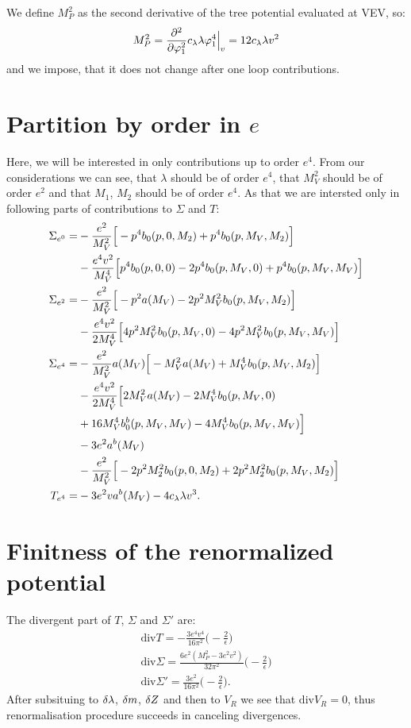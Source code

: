 We define $M_P^2$ as the second derivative of the tree potential evaluated at VEV, so:
\begin{equation}
M_P^2 = \frac{\partial^2}{\partial \varphi_1^2}c_\lambda\lambda\varphi_1^4\Big|_{v} = 12c_\lambda\lambda v^2
\end{equation}
and we impose, that it does not change after one loop contributions. \\
\section{Partition by order in \texorpdfstring{$e$}{e}}
Here, we will be interested in only contributions up to order $e^4$. From our \MSbar considerations 
we can see, that $\lambda$ should be of order $e^4$, that $M_V^2$ should be of order $e^2$ and 
that $M_1$, $M_2$ should be of order $e^4$. 
As that we are 
intersted only in following parts of contributions to $\Sigma$ and $T$:
\begin{align}
\Sigma_{e^0} = &-\frac{e^2}{M_V^2}\Big[-p^4b_0(p,0,M_2)+p^4b_0(p,M_V,M_2)\Big]\notag \\
&-\frac{e^4v^2}{M_V^4}\Big[p^4b_0(p,0,0)-2p^4b_0(p,M_V,0)+p^4b_0(p,M_V,M_V)\Big] \\
\Sigma_{e^2} = &-\frac{e^2}{M_V^2}\Big[-p^2a(M_V)-2p^2M_V^2b_0(p,M_V,M_2)\Big]\notag \\
&-\frac{e^4v^2}{2M_V^4}\Big[4p^2M_V^2b_0(p,M_V,0)-4p^2M_V^2b_0(p,M_V,M_V)\Big] \\
\Sigma_{e^4} = &-\frac{e^2}{M_V^2}a(M_V)\Big[-M_V^2a(M_V)+M_V^4b_0(p,M_V,M_2)\Big]\notag \\
&-\frac{e^4v^2}{2M_V^4}\Big[2M_V^2a(M_V)-2M_V^4b_0(p,M_V,0)\notag \\
&+16M_V^4b_0^b(p,M_V,M_V)-4M_V^4b_0(p,M_V,M_V)\Big]\notag\\
&-3e^2a^b(M_V)\notag\\
&-\frac{e^2}{M_V^2}\Big[-2p^2M_2^2b_0(p,0,M_2)+2p^2M_2^2b_0(p,M_V,M_2)\Big] \\
T_{e^4} = & -3e^2va^b(M_V)-4c_\lambda\lambda v^3.
\end{align}
\section{Finitness of the renormalized potential}
The divergent part of $T$, $\Sigma$ and $\Sigma'$ are:
\begin{align}
\textrm{div}T = -\frac{3e^4v^4}{16\pi^2}\Big(-\frac{2}{\epsilon}\Big)\\
\textrm{div}\Sigma = \frac{6e^2(M_P^2-3e^2v^2)}{32\pi^2}\Big(-\frac{2}{\epsilon}\Big)\\
\textrm{div}\Sigma' = \frac{3e^2}{16\pi^2}\Big(-\frac{2}{\epsilon}\Big).
\end{align}
After subsituing to $\delta\lambda$, $\delta m$, $\delta Z$ and then to $V_R$ we see that $\textrm{div}V_R = 0$, 
thus renormalisation procedure succeeds in canceling divergences. \\
